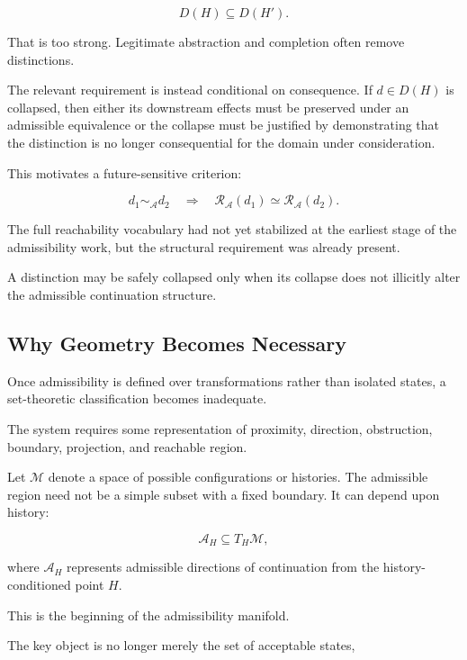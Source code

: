 \documentclass[11pt]{article}
\theoremstyle{remark}
\newcommand{\Adm}{\mathcal{A}}
\newcommand{\Reach}{\mathcal{R}}
\begin{document}
\begin{equation}
D(H)\subseteq D(H').
\end{equation}

That is too strong. Legitimate abstraction and completion often remove distinctions.

The relevant requirement is instead conditional on consequence. If $d\in D(H)$ is collapsed, then either its downstream effects must be preserved under an admissible equivalence or the collapse must be justified by demonstrating that the distinction is no longer consequential for the domain under consideration.

This motivates a future-sensitive criterion:

\begin{equation}
d_1\sim_{\Adm} d_2
\quad\Longrightarrow\quad
\Reach_{\Adm}(d_1)
\simeq
\Reach_{\Adm}(d_2).
\end{equation}

The full reachability vocabulary had not yet stabilized at the earliest stage of the admissibility work, but the structural requirement was already present.

A distinction may be safely collapsed only when its collapse does not illicitly alter the admissible continuation structure.

\subsection{Why Geometry Becomes Necessary}

Once admissibility is defined over transformations rather than isolated states, a set-theoretic classification becomes inadequate.

The system requires some representation of proximity, direction, obstruction, boundary, projection, and reachable region.

Let $\mathcal{M}$ denote a space of possible configurations or histories. The admissible region need not be a simple subset with a fixed boundary. It can depend upon history:

\begin{equation}
\Adm_H
\subseteq
T_H\mathcal{M},
\end{equation}

where $\Adm_H$ represents admissible directions of continuation from the history-conditioned point $H$.

This is the beginning of the admissibility manifold.

The key object is no longer merely the set of acceptable states,
\end{document}
